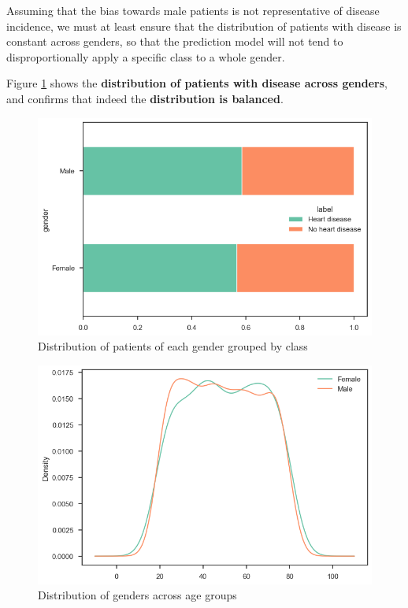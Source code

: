 Assuming that the bias towards male patients is not representative of disease incidence, we must at least
ensure that the distribution of patients with disease is constant across genders, so that the prediction
model will not tend to disproportionally apply a specific class to a whole gender.

Figure \ref{demographics-gender-target-percent} shows the \textbf{distribution of patients with disease across genders},
and confirms that indeed the \textbf{distribution is balanced}.

\begin{figure}
    \caption{Distribution of patients of each gender grouped by class}\label{demographics-gender-target-percent}
    \centering
    \includegraphics[width=\linewidth]{media/demographics-04-gender-target-percentage.png}
\end{figure}


\begin{figure}
    \caption{Distribution of genders across age groups}\label{demographics-gender-agegroup-count}
    \centering
    \includegraphics[width=\linewidth]{media/demographics-02-gender-age.png}
\end{figure}

